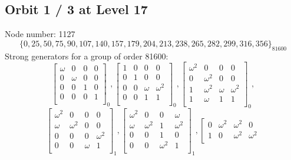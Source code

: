 \subsection*{Orbit 1 / 3 at Level 17}
Node number: 1127\\
$$
\{ 0, 25, 50, 75, 90, 107, 140, 157, 179, 204, 213, 238, 265, 282, 299, 316, 356 \}_{81600}$$
{\small\arraycolsep=2pt
Strong generators for a group of order 81600:
$$
\left[
\begin{array}{*{4}{r}}
\omega  & 0 & 0 & 0\\
0 & \omega  & 0 & 0\\
0 & 0 & 1 & 0\\
0 & 0 & 0 & 1\\
\end{array}
\right]
_{0}
, 
\left[
\begin{array}{*{4}{r}}
1 & 0 & 0 & 0\\
0 & 1 & 0 & 0\\
0 & 0 & \omega  & \omega^{2}\\
0 & 0 & 1 & 1\\
\end{array}
\right]
_{0}
, 
\left[
\begin{array}{*{4}{r}}
\omega^{2} & 0 & 0 & 0\\
0 & \omega^{2} & 0 & 0\\
1 & \omega^{2} & \omega  & \omega^{2}\\
1 & \omega  & 1 & 1\\
\end{array}
\right]
_{0}
, 
$$
$$
\left[
\begin{array}{*{4}{r}}
\omega^{2} & 0 & 0 & 0\\
\omega  & \omega^{2} & 0 & 0\\
0 & 0 & 0 & \omega^{2}\\
0 & 0 & \omega  & 1\\
\end{array}
\right]
_{1}
, 
\left[
\begin{array}{*{4}{r}}
\omega^{2} & 0 & 0 & \omega \\
\omega  & \omega^{2} & 1 & \omega^{2}\\
0 & 0 & 1 & 0\\
0 & 0 & \omega^{2} & 1\\
\end{array}
\right]
_{1}
, 
\left[
\begin{array}{*{4}{r}}
0 & \omega^{2} & \omega^{2} & 0\\
1 & 0 & \omega^{2} & \omega^{2}\\

\end{array}$$}

